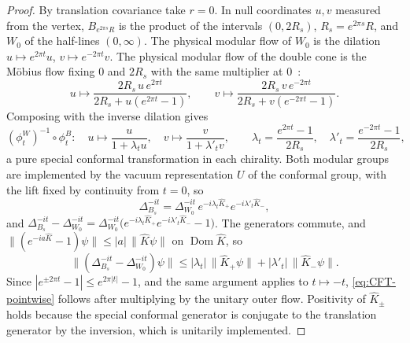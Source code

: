 \documentclass[a4paper,11pt]{article}
\theoremstyle{definition}
\begin{document}
\begin{proof}
By translation covariance take $r=0$. In null coordinates $u,v$ measured from the vertex, $B_{e^{2\pi s}R}$ is the product of the intervals $(0,2R_s)$, $R_s=e^{2\pi s}R$, and $W_0$ of the half-lines $(0,\infty)$. The physical modular flow of $W_0$ is the dilation $u\mapsto e^{2\pi t}u$, $v\mapsto e^{-2\pi t}v$. The physical modular flow of the double cone is the M\"obius flow fixing $0$ and $2R_s$ with the same multiplier at $0$~\cite{HislopLongo1982}:
\[
 u\mapsto\frac{2R_s\,u\,e^{2\pi t}}{2R_s+u(e^{2\pi t}-1)},\qquad
 v\mapsto\frac{2R_s\,v\,e^{-2\pi t}}{2R_s+v(e^{-2\pi t}-1)} .
\]
Composing with the inverse dilation gives
\[
 (\phi^{W}_t)^{-1}\circ\phi^{B}_t:\quad u\mapsto\frac{u}{1+\lambda_tu},\quad v\mapsto\frac{v}{1+\lambda'_tv},\qquad
 \lambda_t=\frac{e^{2\pi t}-1}{2R_s},\quad\lambda'_t=\frac{e^{-2\pi t}-1}{2R_s},
\]
a pure special conformal transformation in each chirality. Both modular groups are implemented by the vacuum representation $U$ of the conformal group, with the lift fixed by continuity from $t=0$, so
\[
 \Delta_{B_s}^{-it}=\Delta_{W_0}^{-it}\,e^{-i\lambda_t\hat K_+}e^{-i\lambda'_t\hat K_-},
\]
and $\Delta_{B_s}^{-it}-\Delta_{W_0}^{-it}=\Delta_{W_0}^{-it}\bigl(e^{-i\lambda_t\hat K_+}e^{-i\lambda'_t\hat K_-}-1\bigr)$. The generators commute, and $\|(e^{-ia\hat K}-1)\psi\|\le|a|\,\|\hat K\psi\|$ on $\operatorname{Dom}\hat K$, so
\[
 \bigl\|(\Delta_{B_s}^{-it}-\Delta_{W_0}^{-it})\psi\bigr\|\le|\lambda_t|\,\|\hat K_+\psi\|+|\lambda'_t|\,\|\hat K_-\psi\| .
\]
Since $|e^{\pm2\pi t}-1|\le e^{2\pi|t|}-1$, and the same argument applies to $t\mapsto-t$, \eqref{eq:CFT-pointwise} follows after multiplying by the unitary outer flow. Positivity of $\hat K_\pm$ holds because the special conformal generator is conjugate to the translation generator by the inversion, which is unitarily implemented.
\end{proof}
\end{document}

